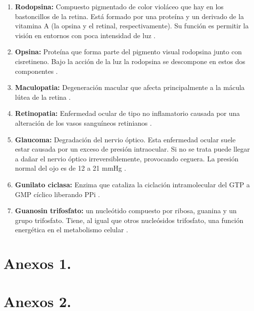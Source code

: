 \documentclass[10pt]{article}
\begin{document}
\begin{enumerate}
\item \textbf{Rodopsina:} Compuesto pigmentado de color violáceo que hay en los bastoncillos de la retina. Está formado por una proteína y un derivado de la vitamina A (la opsina y el retinal, respectivamente). Su función es permitir la visión en entornos con poca intensidad de luz \cite{IEEEreferencias:Ref38}.
\item \textbf{Opsina:} Proteína que forma parte del pigmento visual rodopsina junto con cisretineno. Bajo la acción de la luz la rodopsina se descompone en estos dos componentes \cite{IEEEreferencias:Ref39}.
\item \textbf{Maculopatia:} Degeneración macular que afecta principalmente a la mácula lútea de la retina \cite{IEEEreferencias:Ref38}.
\item \textbf{Retinopatia:} Enfermedad ocular de tipo no inflamatorio causada por una alteración de los vasos sanguíneos retinianos \cite{IEEEreferencias:Ref38}.
\item \textbf{Glaucoma:} Degradación del nervio óptico. Esta enfermedad ocular suele estar causada por un exceso de presión intraocular. Si no se trata puede llegar a dañar el nervio óptico irreversiblemente, provocando ceguera. La presión normal del ojo es de 12 a 21 mmHg \cite{IEEEreferencias:Ref38}.
\item \textbf{Gunilato ciclasa:} Enzima que cataliza la ciclación intramolecular del GTP a GMP cíclico liberando PPi \cite{IEEEreferencias:Ref39}.
\item  \textbf{Guanosin trifosfato:} un nucleótido compuesto por ribosa, guanina y un grupo trifosfato. Tiene, al igual que otros nucleósidos trifosfato, una función energética en el metabolismo celular \cite{IEEEreferencias:Ref39}.

\end{enumerate}
\newpage
 
 

\appendix  
\clearpage %
\addappheadtotoc 
\appendixpage 

\section{Anexos 1.}


\section{Anexos 2.}
\end{document}

